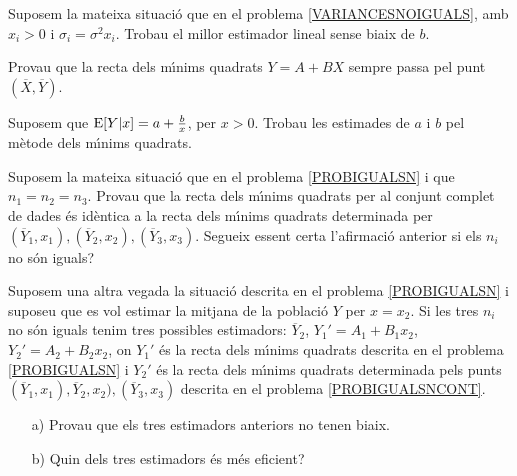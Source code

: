 \begin{prob}
{Suposem la mateixa situaci\'o que en el problema \ref{VARIANCESNOIGUALS},
amb $x_i>0$ i \mbox{$\sigma_i =\sigma^2 x_i$.} Trobau el millor estimador     
lineal sense biaix de $b$.}
\end{prob}

\begin{prob}
{Provau que la recta dels m\'{\i}nims quadrats $Y=A+B X$ sempre passa pel
punt $(\overline{X},\overline{Y})$.}
\end{prob}

\begin{prob}
{Suposem que ${\rm E} [Y|x]=a+\frac{b}{x}$, per $x>0$. Trobau les estimades de $a$
i $b$ pel m\`etode dels m\'{\i}nims quadrats.}
\end{prob}

\begin{prob}
{Suposem la mateixa situaci\'o que en el problema \ref{PROBIGUALSN} i que
$n_1 =n_2 =n_3$. Provau que la recta dels m\'{\i}nims quadrats per al
conjunt complet de dades \'es id\`entica a la recta dels m\'{\i}nims 
quadrats determinada per \mbox{$(\overline{Y}_1,x_1),(\overline{Y}_2,x_2),
(\overline{Y}_3,x_3)$.} Segueix essent certa l'afirmaci\'o anterior
si els $n_i$ no s\'on iguals?}
\end{prob}

\begin{prob}
{Suposem una altra vegada la situaci\'o descrita en el problema \ref{PROBIGUALSN}
 i suposeu que es vol estimar la mitjana de la poblaci\'o $Y$ per $x=x_2$. 
 Si les tres $n_i$ no s\'on iguals tenim tres possibles estimadors:
 $\overline{Y}_2$, \mbox{$Y_1'=A_1 + B_1 x_2$}, \mbox{$Y_2' =A_2 +B_2 x_2$},
 on $Y_1'$ \'es la recta dels m\'{\i}nims quadrats descrita en el problema 
 \ref{PROBIGUALSN} i $Y_2'$ \'es la recta dels m\'{\i}nims quadrats determinada
 pels punts \mbox{$(\overline{Y}_1,x_1),\overline{Y}_2,x_2),
 (\overline{Y}_3,x_3)$} descrita en el problema \ref{PROBIGUALSNCONT}.
\begin{itemize}
\item[a)] Provau que els tres estimadors anteriors no tenen biaix.
\item[b)] Quin dels tres estimadors \'es m\'es eficient?
\end{itemize}}
\end{prob}

\enlargethispage*{1000pt}

